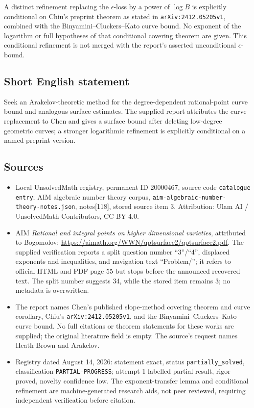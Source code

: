 \documentclass[11pt]{article}
\begin{document}
A distinct refinement replacing the \(\epsilon\)-loss by a power of \(\log B\) is explicitly conditional on Chiu's preprint theorem as stated in \texttt{arXiv:2412.05205v1}, combined with the Binyamini--Cluckers--Kato curve bound. No exponent of the logarithm or full hypotheses of that conditional covering theorem are given. This conditional refinement is not merged with the report's asserted unconditional \(\epsilon\)-bound.
\subsection{Short English statement}
Seek an Arakelov-theoretic method for the degree-dependent rational-point curve bound and analogous surface estimates. The supplied report attributes the curve replacement to Chen and gives a surface bound after deleting low-degree geometric curves; a stronger logarithmic refinement is explicitly conditional on a named preprint version.
\subsection{Sources}
\begin{itemize}
\item Local UnsolvedMath registry, permanent ID \(20000467\), source code \texttt{catalogue entry}; AIM algebraic number theory corpus, \texttt{aim-algebraic-number-theory-notes.json}, notes[118], stored source item 3. Attribution: Ulam AI / UnsolvedMath Contributors, CC BY 4.0.
\item AIM \emph{Rational and integral points on higher dimensional varieties}, attributed to Bogomolov: \url{https://aimath.org/WWN/qptsurface2/qptsurface2.pdf}. The supplied verification reports a split question number ``3''/``4'', displaced exponents and inequalities, and navigation text ``Problem/''; it refers to official HTML and PDF page 55 but stops before the announced recovered text. The split number suggests 34, while the stored item remains 3; no metadata is overwritten.
\item The report names Chen's published slope-method covering theorem and curve corollary, Chiu's \texttt{arXiv:2412.05205v1}, and the Binyamini--Cluckers--Kato curve bound. No full citations or theorem statements for these works are supplied; the original literature field is empty. The source's request names Heath-Brown and Arakelov.
\item Registry dated August 14, 2026: statement exact, status \texttt{partially\_solved}, classification \texttt{PARTIAL-PROGRESS}; attempt 1 labelled partial result, rigor proved, novelty confidence low. The exponent-transfer lemma and conditional refinement are machine-generated research aids, not peer reviewed, requiring independent verification before citation.
\end{itemize}
\end{document}

